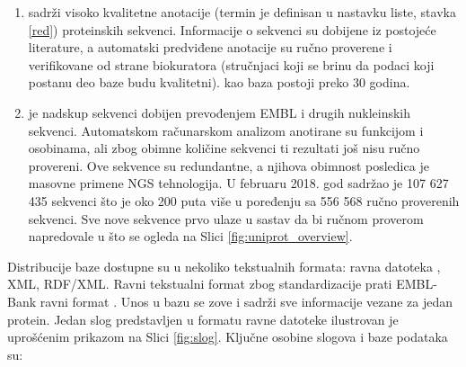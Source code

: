 \begin{enumerate}
  \item \keyword{\swissprot}  sadrži visoko kvalitetne anotacije
     (termin je definisan u nastavku liste,
    stavka \ref{red}) proteinskih sekvenci.  Informacije o sekvenci su dobijene
    iz postojeće literature, a automatski predviđene anotacije su ručno
    proverene i verifikovane od strane biokuratora (stručnjaci koji se brinu da
    podaci koji postanu deo \swissprot baze budu kvalitetni).  \swissprot kao baza
    postoji preko 30 godina.

  \item \trembl {} je nadskup \swissprot sekvenci 
    dobijen prevođenjem EMBL i drugih nukleinskih sekvenci. Automatskom
    računarskom analizom anotirane su funkcijom i osobinama, ali zbog obimne
    količine sekvenci ti rezultati još nisu ručno provereni.  Ove sekvence su
    redundantne, a njihova obimnost posledica je masovne primene NGS
    tehnologija. U februaru 2018. god \trembl sadržao je 107 627 435 sekvenci
    što je oko 200 puta više u poređenju sa 556 568 ručno proverenih \swissprot
    sekvenci. Sve nove sekvence prvo ulaze u sastav \trembl da bi ručnom
    proverom napredovale u \swissprot što se ogleda na Slici
    \ref{fig:uniprot_overview}.
\end{enumerate}





Distribucije \swissprot baze dostupne su u nekoliko tekstualnih formata: ravna
datoteka , XML, RDF/XML.  Ravni tekstualni format zbog
standardizacije prati EMBL-Bank ravni format \parencite{svisprot2003}.
Unos u bazu se zove   i sadrži sve informacije vezane
za jedan protein.  Jedan slog predstavljen u formatu ravne datoteke ilustrovan
je uprošćenim prikazom  na Slici \ref{fig:slog}.  Ključne osobine slogova i
\swissprot baze podataka su:


